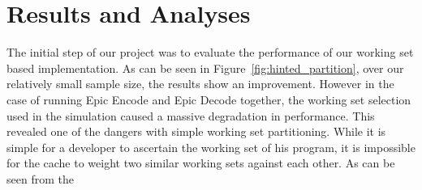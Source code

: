 \documentclass{acm_proc_article-sp}
\begin{document}
\section{Results and Analyses}

The initial step of our project was to evaluate the performance of our working set based implementation. As can be seen in Figure~\ref{fig:hinted_partition}, over our relatively small sample size, the results show an improvement. However in the case of running Epic Encode and Epic Decode together, the working set selection used in the simulation caused a 
massive degradation in performance. This revealed one of the dangers with simple working set partitioning. While it is simple for a developer to ascertain the working set of his program, it is impossible for the cache to weight two similar working sets against each other. As can be seen from the 
\end{document}
